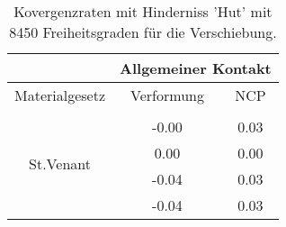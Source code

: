 \begin{table} 
\centering 
\begin{tabular}{c|cc|} 
\cline{2-3} 
 & \multicolumn{2}{|c|}{Allgemeiner Kontakt} \\ 
\hline 
\multicolumn{1}{|c|}{Materialgesetz} & \multicolumn{1}{c|}{Verformung} & \multicolumn{1}{c|}{NCP} \\ 
\hline 
\multicolumn{1}{|c|}{\multirow{5}{*}{St.Venant}} &\multicolumn{1}{|c|}{} & \multicolumn{1}{|c|}{} \\ 
\multicolumn{1}{|c|}{} & \multicolumn{1}{|c|}{     -0.00} & \multicolumn{1}{|c|}{      0.03} \\ 
\multicolumn{1}{|c|}{} & \multicolumn{1}{|c|}{      0.00} & \multicolumn{1}{|c|}{      0.00} \\ 
\multicolumn{1}{|c|}{} & \multicolumn{1}{|c|}{     -0.04} & \multicolumn{1}{|c|}{      0.03} \\ 
\multicolumn{1}{|c|}{} & \multicolumn{1}{|c|}{     -0.04} & \multicolumn{1}{|c|}{      0.03} \\ 
\hline 
\end{tabular}\caption{Kovergenzraten mit Hinderniss 'Hut' mit 8450 Freiheitsgraden für die Verschiebung.}\label{tab:Rate_Hut_level5}
\end{table} 
